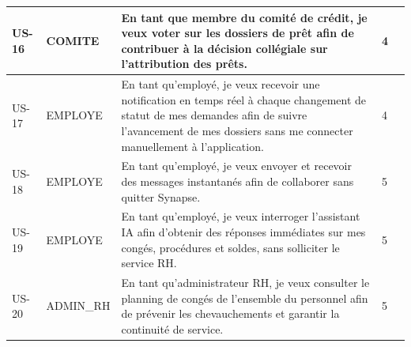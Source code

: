 \begin{table}[H]
\begin{tabularx}{\textwidth}{Vp{0.9cm}|p{1.8cm}|L|p{0.6cm}|}
\hline
US-16 & COMITE & En tant que membre du comité de crédit, je veux voter sur les dossiers de prêt afin de contribuer à la décision collégiale sur l'attribution des prêts. & 4 \\
\hline
US-17 & EMPLOYE & En tant qu’employé, je veux recevoir une notification en temps réel à chaque changement de statut de mes demandes afin de suivre l’avancement de mes dossiers sans me connecter manuellement à l’application. & 4 \\
\hline
US-18 & EMPLOYE & En tant qu’employé, je veux envoyer et recevoir des messages instantanés afin de collaborer sans quitter Synapse. & 5 \\
\hline
US-19 & EMPLOYE & En tant qu’employé, je veux interroger l’assistant IA afin d’obtenir des réponses immédiates sur mes congés, procédures et soldes, sans solliciter le service RH. & 5 \\
\hline
US-20 & ADMIN\_RH & En tant qu’administrateur RH, je veux consulter le planning de congés de l’ensemble du personnel afin de prévenir les chevauchements et garantir la continuité de service. & 5 \\
\hline
\end{tabularx}
\end{table}
\vspace{-1em}
